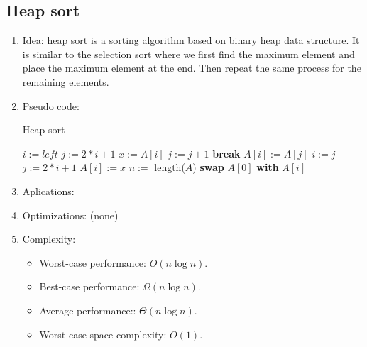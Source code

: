 \documentclass[12pt]{article}
\begin{document}
    \subsection{Heap sort}
    \begin{enumerate}
        \item Idea: heap sort is a sorting algorithm based on binary heap data structure. It is similar to the selection sort where we first find the maximum element and place the maximum element at the end. Then repeat the same process for the remaining elements.
        \item Pseudo code:
        \begin{algorithm}[H]
            \caption{Heap sort}
            \begin{algorithmic}[1]
                    \State $i:=\textit{left}$
                    \State $j:=2*i+1$
                    \State $x:=A[i]$
                        \State $j:=j+1$
                        \EndIf
                        \State \textbf{break}
                        \EndIf
                        \State $A[i]:=A[j]$
                        \State $i:=j$
                        \State $j:=2*i+1$
                    \EndWhile
                    \State $A[i]:=x$
                \EndFunction
                \State
                    \State $n:=$ length($A$)
                        \State {}
                    \EndFor
                        \State \textbf{swap} $A[0]$ \textbf{with} $A[i]$
                        \State {} 
                    \EndFor
                \EndFunction
            \end{algorithmic}
        \end{algorithm}
        \item Aplications:
        \item Optimizations: (none)
        \item Complexity:
        \begin{itemize}
            \item Worst-case performance: $O(n\log n)$.
            \item Best-case performance: $\Omega(n\log n)$.
            \item Average performance:: $\Theta(n\log n)$.
            \item Worst-case space complexity: $O(1)$.
        \end{itemize}
    \end{enumerate}
\end{document}
